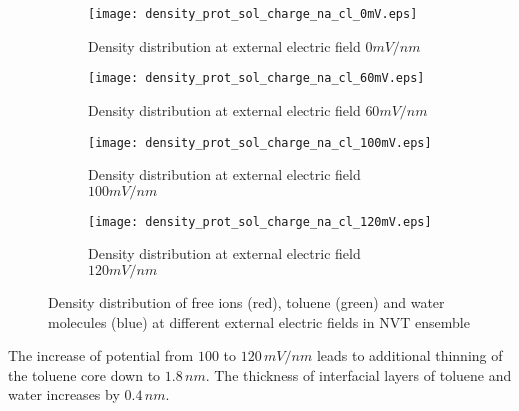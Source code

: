 \begin{figure}[h]
\centering
\begin{subfigure}{.45\textwidth}
  \centering
  \texttt{[image: density\_prot\_sol\_charge\_na\_cl\_0mV.eps]}
  \caption{Density distribution at external electric field $0 mV/nm$}
  \label{fig:nvt_dens_dist_0mV}
\end{subfigure}%
\begin{subfigure}{.45\textwidth}
  \centering
  \texttt{[image: density\_prot\_sol\_charge\_na\_cl\_60mV.eps]}
  \caption{Density distribution at external electric field $60 mV/nm$}
  \label{fig:nvt_dens_dist_60mV}
\end{subfigure}
\begin{subfigure}{.45\textwidth}
  \centering
  \texttt{[image: density\_prot\_sol\_charge\_na\_cl\_100mV.eps]}
  \caption{Density distribution at external electric field $100 mV/nm$}
  \label{fig:nvt_dens_dist_100mV}
\end{subfigure}
\begin{subfigure}{.45\textwidth}
  \centering
  \texttt{[image: density\_prot\_sol\_charge\_na\_cl\_120mV.eps]}
  \caption{Density distribution at external electric field $120 mV/nm$}
  \label{fig:nvt_dens_dist_120mV}
\end{subfigure}
\caption{Density distribution of free ions (red), toluene (green) and water molecules (blue) at different external electric fields in NVT ensemble}
\label{fig:nvt_all_distributions}
\end{figure}

The increase of potential from $100$ to $120\, mV/nm$ leads to additional thinning of the toluene core down to $1.8\, nm$. The thickness of interfacial layers of toluene and water increases by $0.4\, nm$. 



